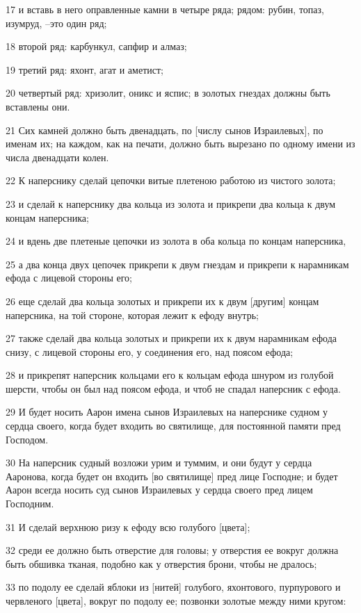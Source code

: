 \par 17 и вставь в него оправленные камни в четыре ряда; рядом: рубин, топаз, изумруд, --это один ряд;
\par 18 второй ряд: карбункул, сапфир и алмаз;
\par 19 третий ряд: яхонт, агат и аметист;
\par 20 четвертый ряд: хризолит, оникс и яспис; в золотых гнездах должны быть вставлены они.
\par 21 Сих камней должно быть двенадцать, по [числу сынов Израилевых], по именам их; на каждом, как на печати, должно быть вырезано по одному имени из числа двенадцати колен.
\par 22 К наперснику сделай цепочки витые плетеною работою из чистого золота;
\par 23 и сделай к наперснику два кольца из золота и прикрепи два кольца к двум концам наперсника;
\par 24 и вдень две плетеные цепочки из золота в оба кольца по концам наперсника,
\par 25 а два конца двух цепочек прикрепи к двум гнездам и прикрепи к нарамникам ефода с лицевой стороны его;
\par 26 еще сделай два кольца золотых и прикрепи их к двум [другим] концам наперсника, на той стороне, которая лежит к ефоду внутрь;
\par 27 также сделай два кольца золотых и прикрепи их к двум нарамникам ефода снизу, с лицевой стороны его, у соединения его, над поясом ефода;
\par 28 и прикрепят наперсник кольцами его к кольцам ефода шнуром из голубой шерсти, чтобы он был над поясом ефода, и чтоб не спадал наперсник с ефода.
\par 29 И будет носить Аарон имена сынов Израилевых на наперснике судном у сердца своего, когда будет входить во святилище, для постоянной памяти пред Господом.
\par 30 На наперсник судный возложи урим и туммим, и они будут у сердца Ааронова, когда будет он входить [во святилище] пред лице Господне; и будет Аарон всегда носить суд сынов Израилевых у сердца своего пред лицем Господним.
\par 31 И сделай верхнюю ризу к ефоду всю голубого [цвета];
\par 32 среди ее должно быть отверстие для головы; у отверстия ее вокруг должна быть обшивка тканая, подобно как у отверстия брони, чтобы не дралось;
\par 33 по подолу ее сделай яблоки из [нитей] голубого, яхонтового, пурпурового и червленого [цвета], вокруг по подолу ее; позвонки золотые между ними кругом:
